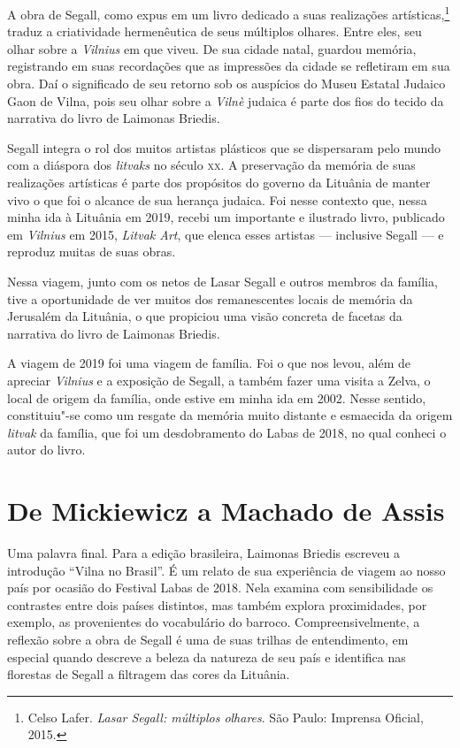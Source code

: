 A obra de Segall, como expus em um livro dedicado a suas realizações
artísticas,\footnote{Celso Lafer. \textit{Lasar Segall: múltiplos
  olhares}. São Paulo: Imprensa Oficial, 2015.} traduz a criatividade
hermenêutica de seus múltiplos olhares. Entre eles, seu olhar sobre a
\textit{Vilnius} em que viveu. De sua cidade natal, guardou memória, registrando
em suas recordações que as impressões da cidade se refletiram em sua
obra. Daí o significado de seu retorno sob os auspícios do Museu Estatal
Judaico Gaon de Vilna, pois seu olhar sobre a \textit{Vilnè} judaica é parte dos
fios do tecido da narrativa do livro de Laimonas Briedis.

Segall integra o rol dos muitos artistas plásticos que se dispersaram
pelo mundo com a diáspora dos \textit{litvaks} no século \textsc{xx}. A preservação
da memória de suas realizações artísticas é parte dos propósitos do
governo da Lituânia de manter vivo o que foi o alcance de sua herança
judaica. Foi nesse contexto que, nessa minha ida à Lituânia em 2019,
recebi um importante e ilustrado livro, publicado em \textit{Vilnius} em 2015,
\textit{Litvak Art}, que elenca esses artistas --- inclusive Segall --- e
reproduz muitas de suas obras.

Nessa viagem, junto com os netos de Lasar Segall e outros membros da
família, tive a oportunidade de ver muitos dos remanescentes locais de
memória da Jerusalém da Lituânia, o que propiciou uma visão concreta de
facetas da narrativa do livro de Laimonas Briedis.

A viagem de 2019 foi uma viagem de família. Foi o que nos levou, além de
apreciar \textit{Vilnius} e a exposição de Segall, a também fazer uma visita a
Zelva, o local de origem da família, onde estive em minha ida em 2002.
Nesse sentido, constituiu"-se como um resgate da memória muito distante e
esmaecida da origem \textit{litvak} da família, que foi um desdobramento
do Labas de 2018, no qual conheci o autor do livro.

\section{De Mickiewicz a Machado de Assis}

Uma palavra final. Para a edição brasileira, Laimonas Briedis escreveu
a introdução ``Vilna no Brasil''. É um relato de sua experiência de
viagem ao nosso país por ocasião do Festival Labas de 2018. Nela examina
com sensibilidade os contrastes entre dois países distintos, mas também
explora proximidades, por exemplo, as provenientes do vocabulário do
barroco. Compreensivelmente, a reflexão sobre a obra de Segall é uma de
suas trilhas de entendimento, em especial quando descreve a beleza da
natureza de seu país e identifica nas florestas de Segall a filtragem
das cores da Lituânia.

